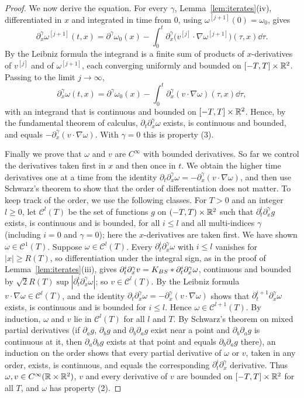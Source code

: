 \begin{proof}
We now derive the equation. For every $\gamma$, Lemma~\ref{lem:iterates}(iv),
differentiated in $x$ and integrated in time from $0$, using
$\omega^{[j+1]}(0)=\omega_0$,
gives
\[
\partial_x^\gamma\omega^{[j+1]}(t,x)=\partial^\gamma\omega_0(x)
-\int_0^t\partial_x^\gamma\big(v^{[j]}\cdot\nabla\omega^{[j+1]}\big)(\tau,x)\dd\tau .
\]
By the Leibniz formula the integrand is a finite sum of products of
$x$-derivatives of $v^{[j]}$ and of $\omega^{[j+1]}$, each converging uniformly
and bounded on $[-T,T]\times\mathbb{R}^2$. Passing to the limit $j\to\infty$,
\[
\partial_x^\gamma\omega(t,x)=\partial^\gamma\omega_0(x)-\int_0^t\partial_x^\gamma(v\cdot\nabla\omega)(\tau,x)\dd\tau,
\]
with an integrand that is continuous and bounded on $[-T,T]\times\mathbb{R}^2$. Hence,
by the fundamental theorem of calculus,
$\partial_t\partial_x^\gamma\omega$ exists, is continuous and bounded, and
equals $-\partial_x^\gamma(v\cdot\nabla\omega)$. With $\gamma=0$ this is
property (3).

Finally we prove that $\omega$ and $v$ are $C^\infty$ with bounded derivatives.
So far we control the derivatives taken first in $x$ and then once in $t$. We
obtain the higher time derivatives one at a time from the identity
$\partial_t\partial_x^\gamma\omega=-\partial_x^\gamma(v\cdot\nabla\omega)$, and
then use Schwarz's theorem to show that the order of differentiation does not
matter. To keep track of the order, we use the following classes.
For $T>0$ and an integer $l\ge0$, let $\mathcal C^l(T)$ be the set of functions
$g$ on $(-T,T)\times\mathbb{R}^2$ such that $\partial_t^i\partial_x^\gamma g$ exists, is
continuous and is bounded, for all $i\le l$ and all multi-indices $\gamma$
(including $i=0$ and $\gamma=0$); here the
$x$-derivatives are taken first. We have shown $\omega\in\mathcal C^1(T)$. Suppose
$\omega\in\mathcal C^l(T)$. Every $\partial_t^i\partial_x^\gamma\omega$ with
$i\le l$ vanishes for $|x|\ge R(T)$, so differentiation under the integral sign,
as in the proof of Lemma~\ref{lem:iterates}(iii), gives
$\partial_t^i\partial_x^\gamma v=K_{BS}\ast\partial_t^i\partial_x^\gamma\omega$,
continuous and bounded by $\sqrt2R(T)\sup|\partial_t^i\partial_x^\gamma\omega|$;
so $v\in\mathcal C^l(T)$. By the Leibniz formula $v\cdot\nabla\omega\in\mathcal C^l(T)$,
and the identity $\partial_t\partial_x^\gamma\omega=-\partial_x^\gamma(v\cdot\nabla\omega)$
shows that $\partial_t^{i+1}\partial_x^\gamma\omega$ exists, is continuous and
is bounded for $i\le l$. Hence $\omega\in\mathcal C^{l+1}(T)$. By induction,
$\omega$ and $v$ lie in $\mathcal C^l(T)$ for all $l$ and $T$. By Schwarz's
theorem on mixed partial derivatives (if $\partial_ag$, $\partial_bg$ and
$\partial_b\partial_ag$ exist near a point and $\partial_b\partial_ag$ is
continuous at it, then $\partial_a\partial_bg$ exists at that point and equals
$\partial_b\partial_ag$ there), an induction on the order shows that every
partial derivative of $\omega$ or $v$, taken in any order, exists, is continuous,
and equals the corresponding $\partial_t^i\partial_x^\gamma$ derivative. Thus
$\omega,v\in C^\infty(\mathbb{R}\times\mathbb{R}^2)$, $v$ and every derivative of $v$ are bounded
on $[-T,T]\times\mathbb{R}^2$ for all $T$, and $\omega$ has property (2).
\end{proof}

